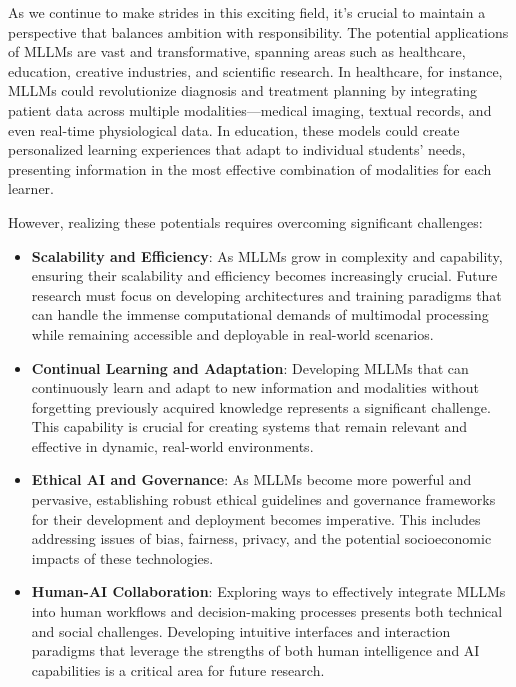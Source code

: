 As we continue to make strides in this exciting field, it's crucial to maintain a perspective that balances ambition with responsibility. The potential applications of MLLMs are vast and transformative, spanning areas such as healthcare, education, creative industries, and scientific research. In healthcare, for instance, MLLMs could revolutionize diagnosis and treatment planning by integrating patient data across multiple modalities—medical imaging, textual records, and even real-time physiological data. In education, these models could create personalized learning experiences that adapt to individual students' needs, presenting information in the most effective combination of modalities for each learner.

However, realizing these potentials requires overcoming significant challenges:

\begin{itemize}
    \item \textbf{Scalability and Efficiency}: As MLLMs grow in complexity and capability, ensuring their scalability and efficiency becomes increasingly crucial. Future research must focus on developing architectures and training paradigms that can handle the immense computational demands of multimodal processing while remaining accessible and deployable in real-world scenarios.

    \item \textbf{Continual Learning and Adaptation}: Developing MLLMs that can continuously learn and adapt to new information and modalities without forgetting previously acquired knowledge represents a significant challenge. This capability is crucial for creating systems that remain relevant and effective in dynamic, real-world environments.

    \item \textbf{Ethical AI and Governance}: As MLLMs become more powerful and pervasive, establishing robust ethical guidelines and governance frameworks for their development and deployment becomes imperative. This includes addressing issues of bias, fairness, privacy, and the potential socioeconomic impacts of these technologies.

    \item \textbf{Human-AI Collaboration}: Exploring ways to effectively integrate MLLMs into human workflows and decision-making processes presents both technical and social challenges. Developing intuitive interfaces and interaction paradigms that leverage the strengths of both human intelligence and AI capabilities is a critical area for future research.
\end{itemize}

